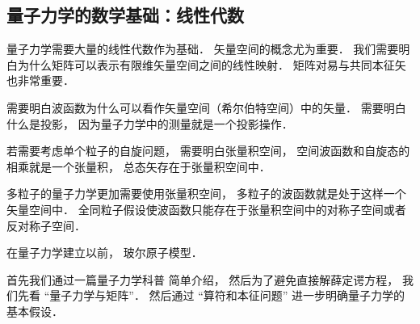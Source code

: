 
\begin{issues}
\issueDraft
\end{issues}

\subsection{量子力学的数学基础：线性代数}
量子力学需要大量的线性代数作为基础． 矢量空间的概念尤为重要． 我们需要明白为什么矩阵可以表示有限维矢量空间之间的线性映射． 矩阵对易与共同本征矢 也非常重要．

需要明白波函数为什么可以看作矢量空间（希尔伯特空间）中的矢量． 需要明白什么是投影， 因为量子力学中的测量就是一个投影操作．

若需要考虑单个粒子的自旋问题， 需要明白张量积空间， 空间波函数和自旋态的相乘就是一个张量积， 总态矢存在于张量积空间中．

多粒子的量子力学更加需要使用张量积空间， 多粒子的波函数就是处于这样一个矢量空间中． 全同粒子假设使波函数只能存在于张量积空间中的对称子空间或者反对称子空间．



在量子力学建立以前， 玻尔原子模型．

首先我们通过一篇量子力学科普 简单介绍， 然后为了避免直接解薛定谔方程， 我们先看 “量子力学与矩阵”． 然后通过 “算符和本征问题” 进一步明确量子力学的基本假设．
